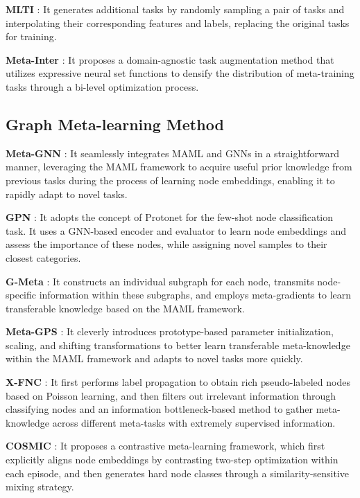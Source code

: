 \noindent \textbf{MLTI} \cite{yao2021meta}: It generates additional tasks by randomly sampling a pair of tasks and interpolating their corresponding features and labels, replacing the original tasks for training.

\noindent \textbf{Meta-Inter} \cite{lee2022set}: It proposes a domain-agnostic task augmentation method that utilizes expressive neural set functions to densify the distribution of meta-training tasks through a bi-level optimization process.

\subsection{Graph Meta-learning Method}
\noindent \textbf{Meta-GNN} \cite{zhou2019meta}: It seamlessly integrates MAML and GNNs in a straightforward manner, leveraging the MAML framework to acquire useful prior knowledge from previous tasks during the process of learning node embeddings, enabling it to rapidly adapt to novel tasks.

\noindent \textbf{GPN} \cite{ding2020graph}: It adopts the concept of Protonet for the few-shot node classification task. It uses a GNN-based encoder and evaluator to learn node embeddings and assess the importance of these nodes, while assigning novel samples to their closest categories.

\noindent \textbf{G-Meta} \cite{huang2020graph}: It constructs an individual subgraph for each node, transmits node-specific information within these subgraphs, and employs meta-gradients to learn transferable knowledge based on the MAML framework.

\noindent \textbf{Meta-GPS} \cite{liu2022few}: It cleverly introduces prototype-based parameter initialization, scaling, and shifting transformations to better learn transferable meta-knowledge within the MAML framework and adapts to novel tasks more quickly.

\noindent \textbf{X-FNC} \cite{wang2023few}: It first performs label propagation to obtain rich pseudo-labeled nodes based on Poisson learning, and then filters out irrelevant information through classifying nodes and an information bottleneck-based method to gather meta-knowledge across different meta-tasks with extremely supervised information.

\noindent \textbf{COSMIC} \cite{wang2023contrastive}: It proposes a contrastive meta-learning framework, which first explicitly aligns node embeddings by contrasting two-step optimization within each episode, and then generates hard node classes through a similarity-sensitive mixing strategy.

